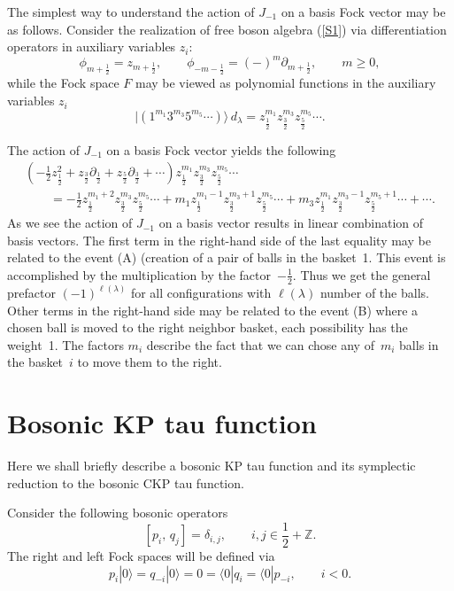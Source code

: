 \documentclass[pdftex]{sigma}
\numberwithin{equation}{section}
\renewcommand{\l}{\langle}
\renewcommand{\r}{\rangle}
\begin{document}
 The simplest way to understand the action of $J_{-1}$ on a
basis Fock vector may be as follows. Consider the realization of
free boson algebra (\ref{S1}) via dif\/ferentiation operators in
auxiliary variables $z_i$:
\[
\phi_{m+\frac12}=z_{m+\frac12},\qquad
\phi_{-m-\frac12}=(-)^{m}\partial_{m+\frac12} ,\qquad m\ge 0,
\]
 while the Fock space $F$ may be viewed as polynomial functions in
 the auxiliary variables $z_i$
\[
|(1^{m_1}3^{m_3}5^{m_5}\cdots)\r \,d_\lambda = z_{\frac
12}^{m_1}z_{\frac 32}^{m_3}z_{\frac 52}^{m_5}\cdots.
\]



The action of $J_{-1}$ on a basis Fock vector yields the following
 \begin{gather*}
\left( -\frac 12z_{\frac12}^2 + z_{\frac32} \partial_{\frac12}+
z_{\frac52}
\partial_{\frac32}+\cdots  \right)
z_{\frac 12}^{m_1}z_{\frac 32}^{m_3}z_{\frac 52}^{m_5}\cdots
\\
\qquad{}=-\frac 12 z_{\frac 12}^{m_1+2}z_{\frac 32}^{m_3}z_{\frac
52}^{m_5}\cdots + m_1 z_{\frac 12}^{m_1-1}z_{\frac
32}^{m_3+1}z_{\frac 52}^{m_5}\cdots   +  m_3 z_{\frac
12}^{m_1}z_{\frac 32}^{m_3-1}z_{\frac 52}^{m_5+1}\cdots  +
\cdots.
 \end{gather*}
As we see the action of $J_{-1}$ on a basis vector results in
linear combination of basis vectors. The f\/irst term in the right-hand
side of the last equality may be related to the event (A)
(creation of a pair of balls in the basket~1. This event is
accomplished by the multiplication by the factor~$-\frac 12$. Thus
we get the general prefactor $(-1)^{\ell(\lambda)}$ for all
conf\/igurations with $\ell(\lambda)$ number of the balls. Other
terms in the right-hand side may be related to the event (B) where
a chosen ball is moved to the right neighbor basket, each
possibility has the weight~1. The factors $m_i$ describe the fact
that we can chose any of~$m_i$ balls in the basket~$i$ to move
them to the right.

\section{Bosonic KP tau function}\label{BosonicKP}

Here we shall brief\/ly describe a bosonic KP tau function and its
symplectic reduction to the bosonic CKP tau function.

Consider the following bosonic operators
\[
[p_i,\,q_j] = \delta_{i,j} ,\qquad i, j\in \frac 12+\mathbb{Z} .
\]
The right and left Fock spaces will be def\/ined via
\[
p_i|0\r=q_{-i}|0\r = 0 = \l 0|q_i=\l 0|p_{-i} ,\qquad i<0 .
\]
\end{document}
